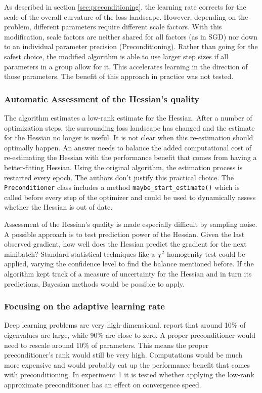 \documentclass[twoside,12pt,a4paper]{report}
\begin{document}
As described in section \ref{sec:preconditioning}, the learning rate corrects for the scale of the overall curvature of the loss landscape. However, depending on the problem, different parameters require different scale factors. With this modification, scale factors are neither shared for all factors (as in SGD) nor down to an individual parameter precision (Preconditioning).
Rather than going for the safest choice, the modified algorithm is able to use larger step sizes if all parameters in a group allow for it. This accelerates learning in the direction of those parameters. The benefit of this approach in practice was not tested.

\subsubsection{Automatic Assessment of the Hessian's quality}
The algorithm estimates a low-rank estimate for the Hessian. After a number of optimization steps, the surrounding loss landscape has changed and the estimate for the Hessian no longer is useful.
It is not clear when this re-estimation should optimally happen. An answer needs to balance the added computational cost of re-estimating the Hessian with the performance benefit that comes from having a better-fitting Hessian.
Using the original algorithm, the estimation process is restarted every epoch. The authors don't justify this practical choice.
The \verb|Preconditioner| class includes a method \verb|maybe_start_estimate()| which is called before every step of the optimizer and could be used to dynamically assess whether the Hessian is out of date.

Assessment of the Hessian's quality is made especially difficult by sampling noise. A possible approach is to test prediction power of the Hessian. Given the last observed gradient, how well does the Hessian predict the gradient for the next minibatch? Standard statistical techniques like a $\chi^2$ homogenity test could be applied, varying the confidence level to find the balance mentioned before.
If the algorithm kept track of a measure of uncertainty for the Hessian and in turn its predictions, Bayesian methods would be possible to apply.

\subsubsection{Focusing on the adaptive learning rate}
Deep learning problems are very high-dimensional. \cite{Chaudhari2017entropy} report that around 10\% of eigenvalues are large, while 90\% are close to zero. A proper preconditioner would need to rescale around 10\% of parameters. This means the proper preconditioner's rank would still be very high. Computations would be much more expensive and would probably eat up the performance benefit that comes with preconditioning.
In experiment 1 it is tested whether applying the low-rank approximate preconditioner has an effect on convergence speed.
\end{document}
